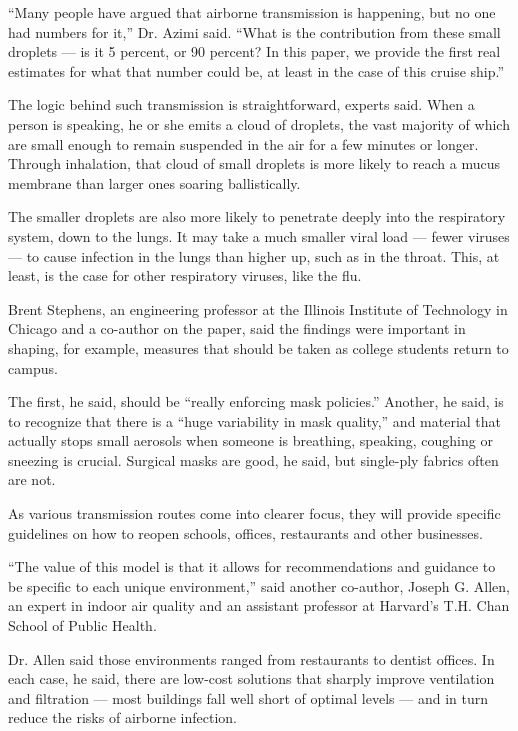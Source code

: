 ``Many people have argued that airborne transmission is happening, but
no one had numbers for it,'' Dr. Azimi said. ``What is the contribution
from these small droplets --- is it 5 percent, or 90 percent? In this
paper, we provide the first real estimates for what that number could
be, at least in the case of this cruise ship.''

The logic behind such transmission is straightforward, experts said.
When a person is speaking, he or she emits a cloud of droplets, the vast
majority of which are small enough to remain suspended in the air for a
few minutes or longer. Through inhalation, that cloud of small droplets
is more likely to reach a mucus membrane than larger ones soaring
ballistically.

The smaller droplets are also more likely to penetrate deeply into the
respiratory system, down to the lungs. It may take a much smaller viral
load --- fewer viruses --- to cause infection in the lungs than higher
up, such as in the throat. This, at least, is the case for other
respiratory viruses, like the flu.

Brent Stephens, an engineering professor at the Illinois Institute of
Technology in Chicago and a co-author on the paper, said the findings
were important in shaping, for example, measures that should be taken as
college students return to campus.

The first, he said, should be ``really enforcing mask policies.''
Another, he said, is to recognize that there is a ``huge variability in
mask quality,'' and material that actually stops small aerosols when
someone is breathing, speaking, coughing or sneezing is crucial.
Surgical masks are good, he said, but single-ply fabrics often are not.

As various transmission routes come into clearer focus, they will
provide specific guidelines on how to reopen schools, offices,
restaurants and other businesses.

``The value of this model is that it allows for recommendations and
guidance to be specific to each unique environment,'' said another
co-author, Joseph G. Allen, an expert in indoor air quality and an
assistant professor at Harvard's T.H. Chan School of Public Health.

Dr. Allen said those environments ranged from restaurants to dentist
offices. In each case, he said, there are low-cost solutions that
sharply improve ventilation and filtration --- most buildings fall well
short of optimal levels --- and in turn reduce the risks of airborne
infection.

